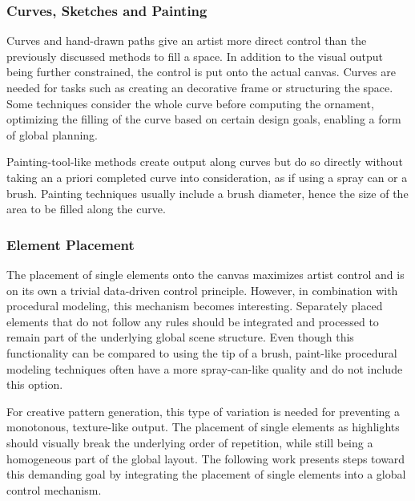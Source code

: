 \subsubsection{Curves, Sketches and Painting}
\label{subsubsec:commonly_used_control_mechanisms_curves}

Curves and hand-drawn paths give an artist more direct control than the previously discussed methods to fill a space. In addition to the visual output being further constrained, the control is put onto the actual canvas. Curves are needed for tasks such as creating an decorative frame or structuring the space. Some techniques consider the whole curve before computing the ornament, optimizing the filling of the curve based on certain design goals, enabling a form of global planning.

Painting-tool-like methods create output along curves but do so directly without taking an a priori completed curve into consideration, as if using a spray can or a brush. Painting techniques usually include a brush diameter, hence the size of the area to be filled along the curve.

\subsubsection{Element Placement}
\label{subsubsec:commonly_used_control_mechanisms_elements}

The placement of single elements onto the canvas maximizes artist control and is on its own a trivial data-driven control principle. However, in combination with procedural modeling, this mechanism becomes interesting. Separately placed elements that do not follow any rules should be integrated and processed to remain part of the underlying global scene structure. Even though this functionality can be compared to using the tip of a brush, paint-like procedural modeling techniques often have a more spray-can-like quality \cite{mech_2012_tdf} and do not include this option.

For creative pattern generation, this type of variation is needed for preventing a monotonous, texture-like output. The placement of single elements as highlights should visually break the underlying order of repetition, while still being a homogeneous part of the global layout. The following work presents steps toward this demanding goal by integrating the placement of single elements into a global control mechanism.














